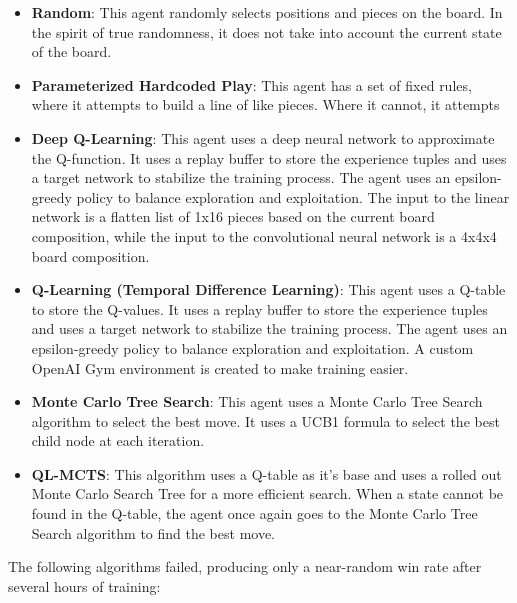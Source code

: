\begin{itemize}
    \item \textbf{Random}: This agent randomly selects positions and pieces on the board. In the spirit of true randomness, it does not take into account the current state of the board.
    \item \textbf{Parameterized Hardcoded Play}: This agent has a set of fixed rules, where it attempts to build a line of like pieces. Where it cannot, it attempts
    \item \textbf{Deep Q-Learning}: This agent uses a deep neural network to approximate the Q-function. It uses a replay buffer to store the experience tuples and uses a target network to stabilize the training process. The agent uses an epsilon-greedy policy to balance exploration and exploitation. The input to the linear network is a flatten list of 1x16 pieces based on the current board composition, while the input to the convolutional neural network is a 4x4x4 board composition.
    \item \textbf{Q-Learning (Temporal Difference Learning)}: This agent uses a Q-table to store the Q-values. It uses a replay buffer to store the experience tuples and uses a target network to stabilize the training process. The agent uses an epsilon-greedy policy to balance exploration and exploitation. A custom OpenAI Gym environment is created to make training easier.
    \item \textbf{Monte Carlo Tree Search}: This agent uses a Monte Carlo Tree Search algorithm to select the best move. It uses a UCB1 formula to select the best child node at each iteration.
    \item \textbf{QL-MCTS}: This algorithm uses a Q-table as it's base and uses a rolled out Monte Carlo Search Tree for a more efficient search. When a state cannot be found in the Q-table, the agent once again goes to the Monte Carlo Tree Search algorithm to find the best move.
\end{itemize}

The following algorithms failed, producing only a near-random win rate after several hours of training:

